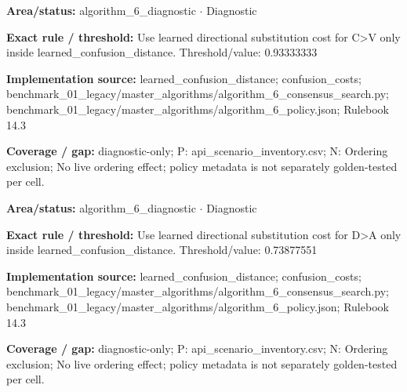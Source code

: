 \begin{tcolorbox}[enhanced,breakable,colback=white,colframe=Muted!45,boxrule=0.45pt,arc=1.5pt,left=6pt,right=6pt,top=5pt,bottom=5pt,title={\texttt{A6-LEARNED-SUBSTITUTION-C-V}},title after break={\texttt{A6-LEARNED-SUBSTITUTION-C-V}\ (continued)},fonttitle=\headingfont\bfseries\color{Navy},coltitle=Navy]
\textbf{Area/status:} algorithm\_\allowbreak{}6\_\allowbreak{}diagnostic $\boldsymbol{\cdot}$ Diagnostic\par
\smallskip
\textbf{Exact rule / threshold:} Use learned directional substitution cost for C>V only inside learned\_\allowbreak{}confusion\_\allowbreak{}distance. Threshold/\allowbreak{}value: 0.93333333\par
\smallskip
\textbf{Implementation source:} learned\_\allowbreak{}confusion\_\allowbreak{}distance; confusion\_\allowbreak{}costs; benchmark\_\allowbreak{}01\_\allowbreak{}legacy/\allowbreak{}master\_\allowbreak{}algorithms/\allowbreak{}algorithm\_\allowbreak{}6\_\allowbreak{}consensus\_\allowbreak{}search.py; benchmark\_\allowbreak{}01\_\allowbreak{}legacy/\allowbreak{}master\_\allowbreak{}algorithms/\allowbreak{}algorithm\_\allowbreak{}6\_\allowbreak{}policy.json; Rulebook 14.3\par
\smallskip
\textbf{Coverage / gap:} diagnostic-only; P: api\_\allowbreak{}scenario\_\allowbreak{}inventory.csv; N: Ordering exclusion; No live ordering effect; policy metadata is not separately golden-tested per cell.
\end{tcolorbox}
\begin{tcolorbox}[enhanced,breakable,colback=white,colframe=Muted!45,boxrule=0.45pt,arc=1.5pt,left=6pt,right=6pt,top=5pt,bottom=5pt,title={\texttt{A6-LEARNED-SUBSTITUTION-D-A}},title after break={\texttt{A6-LEARNED-SUBSTITUTION-D-A}\ (continued)},fonttitle=\headingfont\bfseries\color{Navy},coltitle=Navy]
\textbf{Area/status:} algorithm\_\allowbreak{}6\_\allowbreak{}diagnostic $\boldsymbol{\cdot}$ Diagnostic\par
\smallskip
\textbf{Exact rule / threshold:} Use learned directional substitution cost for D>A only inside learned\_\allowbreak{}confusion\_\allowbreak{}distance. Threshold/\allowbreak{}value: 0.73877551\par
\smallskip
\textbf{Implementation source:} learned\_\allowbreak{}confusion\_\allowbreak{}distance; confusion\_\allowbreak{}costs; benchmark\_\allowbreak{}01\_\allowbreak{}legacy/\allowbreak{}master\_\allowbreak{}algorithms/\allowbreak{}algorithm\_\allowbreak{}6\_\allowbreak{}consensus\_\allowbreak{}search.py; benchmark\_\allowbreak{}01\_\allowbreak{}legacy/\allowbreak{}master\_\allowbreak{}algorithms/\allowbreak{}algorithm\_\allowbreak{}6\_\allowbreak{}policy.json; Rulebook 14.3\par
\smallskip
\textbf{Coverage / gap:} diagnostic-only; P: api\_\allowbreak{}scenario\_\allowbreak{}inventory.csv; N: Ordering exclusion; No live ordering effect; policy metadata is not separately golden-tested per cell.
\end{tcolorbox}
